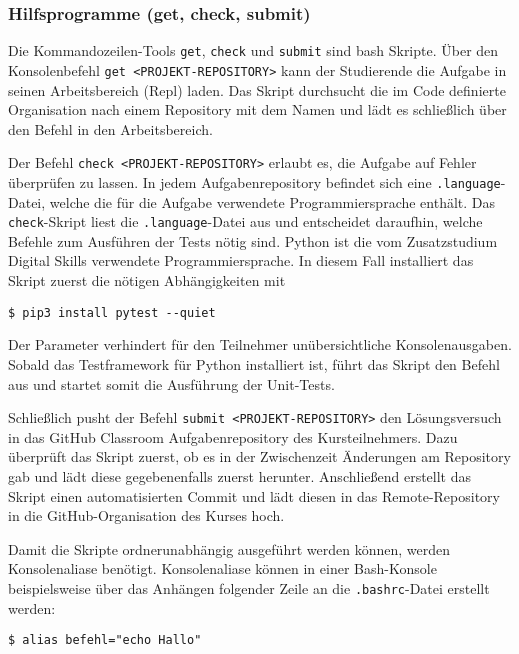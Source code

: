 \subsubsection{Hilfsprogramme (get, check, submit)}
\label{replit-template-wrapper-tools}
Die Kommandozeilen-Tools \texttt{get}, \texttt{check} und \texttt{submit} sind
\ac{bash} Skripte. Über den Konsolenbefehl \texttt{get <PROJEKT-REPOSITORY>}
kann der Studierende die Aufgabe in seinen Arbeitsbereich (Repl) laden. Das
Skript durchsucht die im Code definierte Organisation nach einem Repository mit
dem Namen und lädt es schließlich über den Befehl  in den
Arbeitsbereich.

Der Befehl \texttt{check <PROJEKT-REPOSITORY>} erlaubt es, die Aufgabe auf
Fehler überprüfen zu lassen. In jedem Aufgabenrepository befindet sich eine
\texttt{.language}-Datei, welche die für die Aufgabe verwendete
Programmiersprache enthält. Das \texttt{check}-Skript liest die
\texttt{.language}-Datei aus und entscheidet daraufhin, welche Befehle zum
Ausführen der Tests nötig sind. Python ist die vom Zusatzstudium Digital Skills
verwendete Programmiersprache. In diesem Fall installiert das Skript zuerst die
nötigen Abhängigkeiten mit

\begin{lstlisting}[style=Bash]
$ pip3 install pytest --quiet
\end{lstlisting}

Der Parameter  verhindert für den Teilnehmer unübersichtliche
Konsolenausgaben. Sobald das Testframework für Python installiert ist, führt das
Skript den Befehl  aus und startet somit die Ausführung der
Unit-Tests.

Schließlich pusht der Befehl \texttt{submit <PROJEKT-REPOSITORY>}
den Lösungsversuch in das GitHub Classroom Aufgabenrepository des
Kursteilnehmers. Dazu überprüft das Skript zuerst, ob es in der Zwischenzeit
Änderungen am Repository gab und lädt diese gegebenenfalls zuerst herunter.
Anschließend erstellt das Skript einen automatisierten Commit und lädt diesen
in das Remote-Repository in die GitHub-Organisation des Kurses hoch.

Damit die Skripte ordnerunabhängig ausgeführt werden können, werden
Konsolenaliase benötigt. Konsolenaliase können in einer Bash-Konsole
beispielsweise über das Anhängen folgender Zeile an die \texttt{.bashrc}-Datei
erstellt werden:

\begin{lstlisting}[style=Bash]
$ alias befehl="echo Hallo"
\end{lstlisting}

